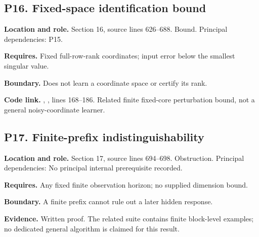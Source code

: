 \documentclass[11pt,letterpaper]{article}
\begin{document}
\par\noindent\begin{minipage}{\textwidth}
\subsection{P16. Fixed-space identification
bound}\label{p16.-fixed-space-identification-bound}

\textbf{Location and role.} Section 16, source lines 626--688. Bound.
Principal dependencies: P15.

\textbf{Requires.} Fixed full-row-rank coordinates; input error below
the smallest singular value.

\textbf{Boundary.} Does not learn a coordinate space or certify its
rank.

\textbf{Code link.} ,
, lines 168--186. Related finite fixed-core
perturbation bound, not a general noisy-coordinate learner.
\end{minipage}\par\medskip

\par\noindent\begin{minipage}{\textwidth}
\subsection{P17. Finite-prefix
indistinguishability}\label{p17.-finite-prefix-indistinguishability}

\textbf{Location and role.} Section 17, source lines 694--698.
Obstruction. Principal dependencies: No principal internal prerequisite
recorded.

\textbf{Requires.} Any fixed finite observation horizon; no supplied
dimension bound.

\textbf{Boundary.} A finite prefix cannot rule out a later hidden
response.

\textbf{Evidence.} Written proof. The related suite contains finite
block-level examples; no dedicated general algorithm is claimed for this
result.
\end{minipage}\par\medskip
\end{document}
